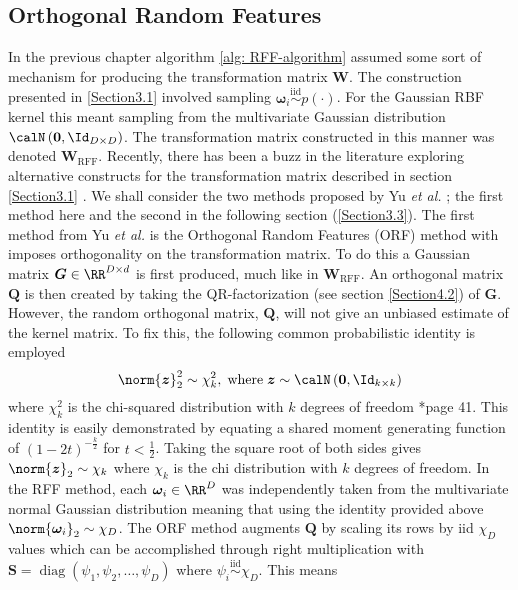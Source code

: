 \subsection{Orthogonal Random Features}\label{Section3.2}
In the previous chapter algorithm \ref{alg: RFF-algorithm} assumed some sort of mechanism for producing the transformation matrix $\bm{W}$. The construction presented in \ref{Section3.1} involved sampling $\bm{\omega}_{i} \stackrel{\text{iid}}{\sim} p(\cdot)$. For the Gaussian RBF kernel this meant sampling from the multivariate Gaussian distribution $\calN \left( \bm{0} , \Id_{D \times D} \right)$. The transformation matrix constructed in this manner was denoted $\bm{W}_{\text{RFF}}$. Recently, there has been a buzz in the literature exploring alternative constructs for the transformation matrix described in section \ref{Section3.1} \cite{LiuFanghui2021RFfK}. We shall consider the two methods proposed by Yu {\it et al.} \cite{YuFelixX2016ORF}; the first method here and the second in the following section (\ref{Section3.3}). The first method from Yu {\it et al.} is the Orthogonal Random Features (ORF) method with imposes orthogonality on the transformation matrix. To do this a Gaussian matrix $\bm{G} \in \RR^{D \times d}$ is first produced, much like in $\bm{W}_{\text{RFF}}$. An orthogonal matrix $\bm{Q}$ is then created by taking the QR-factorization (see section \ref{Section4.2}) of $\bm{G}$. However, the random orthogonal matrix, $\bm{Q}$, will not give an unbiased estimate of the kernel matrix. To fix this, the following common probabilistic identity is employed
\[
    \norm{\bm{z}}^2_2 \sim \chi^2_k, \; \text{where} \; \bm{z} \sim \calN \left( \bm{0}, \Id_{k \times k} \right)
\]
where $\chi^2_k$ is the chi-squared distribution with $k$ degrees of freedom \cite{BrockwellPeterJ1991TSTa}*{page 41}. This identity is easily demonstrated by equating a shared moment generating function of $(1-2t)^{-\frac{k}{2}}$ for $t < \frac{1}{2}$. Taking the square root of both sides gives $\norm{\bm{z}}_2 \sim \chi_k$ where $\chi_k$ is the chi distribution with $k$ degrees of freedom. In the RFF method, each $\bm{\omega}_i \in \RR^D$ was independently taken from the multivariate normal Gaussian distribution meaning that using the identity provided above $\norm{\bm{\omega}_i}_2 \sim \chi_D$. The ORF method augments $\bm{Q}$ by scaling its rows by iid $\chi_D$ values which can be accomplished through right multiplication with $\bm{S} = \operatorname{diag} \left( \psi_1 , \psi_2 , \ldots , \psi_D \right)$ where $\psi_i \stackrel{\text{iid}}{\sim} \chi_D$. This means
